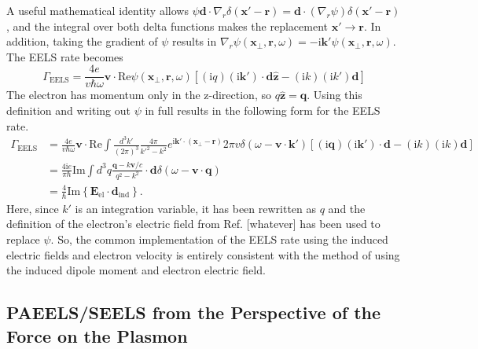 \documentclass [11pt, proquest] {uwthesis}[2016/11/22]
\begin{document}
A useful mathematical identity allows $\psi\textbf{d}\cdot\nabla_r\delta(\textbf{x}'-\textbf{r}) = \textbf{d}\cdot(\nabla_r\psi)\delta(\textbf{x}'-\textbf{r})$, and the integral over both delta functions makes the replacement $\textbf{x}' \rightarrow \textbf{r}$. In addition, taking the gradient of $\psi$ results in $\nabla_r\psi(\textbf{x}_{\perp},\textbf{r},\omega) = -\textrm{i}\textbf{k}'\psi(\textbf{x}_{\perp},\textbf{r},\omega)$. The EELS rate becomes
\begin{equation}
\Gamma_{\textrm{EELS}} = \frac{4e}{v\hbar\omega}\textbf{v}\cdot \textrm{Re}\psi(\textbf{x}_{\perp},\textbf{r},\omega) \left[(\textrm{i}q)(\textrm{i}\textbf{k}') \cdot \textbf{d}\hat{\textbf{z}} - (\textrm{i}k)(\textrm{i}k')\textbf{d}\right]
\end{equation}
The electron has momentum only in the z-direction, so $q\hat{\textbf{z}} = \textbf{q}$. Using this definition and writing out $\psi$ in full results in the following form for the EELS rate.
\begin{equation}
\begin{aligned}
\Gamma_{\textrm{EELS}} &= \frac{4e}{v\hbar\omega}\textbf{v}\cdot \textrm{Re}\int \frac{d^3k'}{(2\pi)^3} \frac{4\pi}{k'^2 - k^2} e^{\textrm{i}\textbf{k}'\cdot(\textbf{x}_{\perp}-\textbf{r})} 2\pi v \delta(\omega-\textbf{v}\cdot\textbf{k}') \left[(\textrm{i}\textbf{q})(\textrm{i}\textbf{k}') \cdot \textbf{d} - (\textrm{i}k)(\textrm{i}k)\textbf{d}\right]\\
&= \frac{4\textrm{i}e}{\pi\hbar} \textrm{Im}\int d^3q \frac{\textbf{q} - k\textbf{v}/c}{q^2 - k^2} \cdot \textbf{d} \delta(\omega - \textbf{v} \cdot \textbf{q})\\
&= \frac{4}{\hbar}\textrm{Im}\left\{ \textbf{E}_{\textrm{el}} \cdot \textbf{d}_{\textrm{ind}}\right\}.
\end{aligned}
\end{equation}
Here, since $k'$ is an integration variable, it has been rewritten as $q$ and the definition of the electron's electric field from Ref. [whatever] has been used to replace $\psi$. So, the common implementation of the EELS rate using the induced electric fields and electron velocity is entirely consistent with the method of using the induced dipole moment and electron electric field.

\subsection{PAEELS/SEELS from the Perspective of the Force on the Plasmon}
\end{document}
